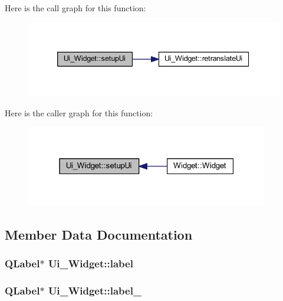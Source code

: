 Here is the call graph for this function\+:\nopagebreak
\begin{figure}[H]
\begin{center}
\leavevmode
\includegraphics[width=339pt]{class_ui___widget_a9039ed8704971418cbe19ef8c9eea266_cgraph}
\end{center}
\end{figure}




Here is the caller graph for this function\+:\nopagebreak
\begin{figure}[H]
\begin{center}
\leavevmode
\includegraphics[width=301pt]{class_ui___widget_a9039ed8704971418cbe19ef8c9eea266_icgraph}
\end{center}
\end{figure}




\subsection{Member Data Documentation}
\subsubsection[{\texorpdfstring{label}{label}}]{\setlength{\rightskip}{0pt plus 5cm}Q\+Label$\ast$ Ui\+\_\+\+Widget\+::label}\hypertarget{class_ui___widget_a3126b93450dcc18cede73b9d1ee7c6b0}{}\label{class_ui___widget_a3126b93450dcc18cede73b9d1ee7c6b0}
\subsubsection[{\texorpdfstring{label\+\_\+2}{label_2}}]{\setlength{\rightskip}{0pt plus 5cm}Q\+Label$\ast$ Ui\+\_\+\+Widget\+::label\+\_}\hypertarget{class_ui___widget_a6f06b143349464b5b19ac0ffe2fc084d}{}\label{class_ui___widget_a6f06b143349464b5b19ac0ffe2fc084d}
